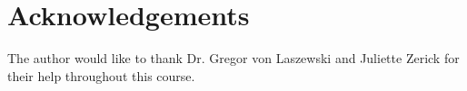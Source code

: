 \documentclass[sigconf]{acmart}
\begin{document}
\section{Acknowledgements}
The author would like to thank Dr. Gregor von Laszewski and Juliette Zerick for their help throughout this course.



\end{document}
